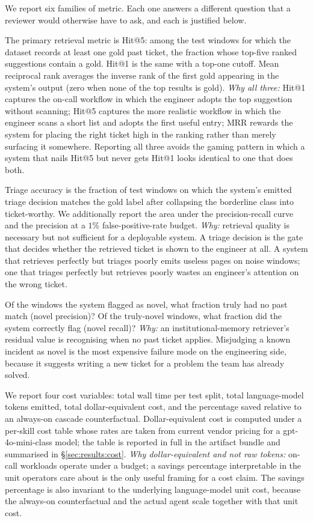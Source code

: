 We report six families of metric. Each one answers a different question that a reviewer would otherwise have to ask, and each is justified below.

 The primary retrieval metric is Hit@5: among the test windows for which the dataset records at least one gold past ticket, the fraction whose top-five ranked suggestions contain a gold. Hit@1 is the same with a top-one cutoff. Mean reciprocal rank averages the inverse rank of the first gold appearing in the system's output (zero when none of the top results is gold). \emph{Why all three:} Hit@1 captures the on-call workflow in which the engineer adopts the top suggestion without scanning; Hit@5 captures the more realistic workflow in which the engineer scans a short list and adopts the first useful entry; MRR rewards the system for placing the right ticket high in the ranking rather than merely surfacing it somewhere. Reporting all three avoids the gaming pattern in which a system that nails Hit@5 but never gets Hit@1 looks identical to one that does both.

 Triage accuracy is the fraction of test windows on which the system's emitted triage decision matches the gold label after collapsing the borderline class into ticket-worthy. We additionally report the area under the precision-recall curve and the precision at a $1\%$ false-positive-rate budget. \emph{Why:} retrieval quality is necessary but not sufficient for a deployable system. A triage decision is the gate that decides whether the retrieved ticket is shown to the engineer at all. A system that retrieves perfectly but triages poorly emits useless pages on noise windows; one that triages perfectly but retrieves poorly wastes an engineer's attention on the wrong ticket.

 Of the windows the system flagged as novel, what fraction truly had no past match (novel precision)? Of the truly-novel windows, what fraction did the system correctly flag (novel recall)? \emph{Why:} an institutional-memory retriever's residual value is recognising when no past ticket applies. Misjudging a known incident as novel is the most expensive failure mode on the engineering side, because it suggests writing a new ticket for a problem the team has already solved.

 We report four cost variables: total wall time per test split, total language-model tokens emitted, total dollar-equivalent cost, and the percentage saved relative to an always-on cascade counterfactual. Dollar-equivalent cost is computed under a per-skill cost table whose rates are taken from current vendor pricing for a gpt-4o-mini-class model; the table is reported in full in the artifact bundle and summarised in \S\ref{sec:results:cost}. \emph{Why dollar-equivalent and not raw tokens:} on-call workloads operate under a budget; a savings percentage interpretable in the unit operators care about is the only useful framing for a cost claim. The savings percentage is also invariant to the underlying language-model unit cost, because the always-on counterfactual and the actual agent scale together with that unit cost.

